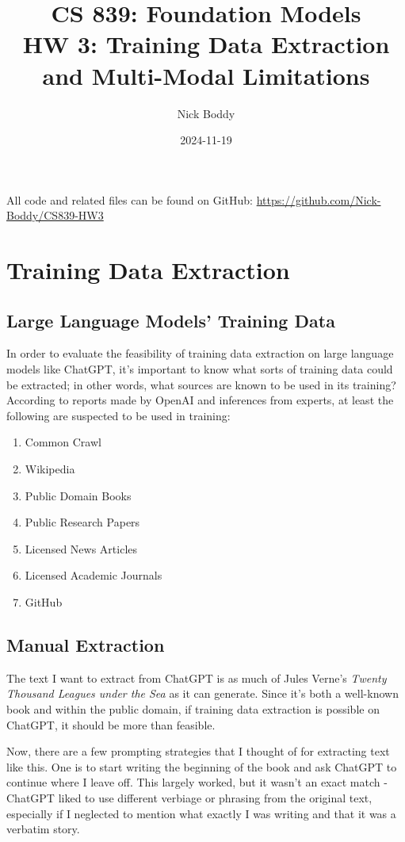 \documentclass{article}
\title{CS 839: Foundation Models \\ HW 3: Training Data Extraction and Multi-Modal Limitations}
\author{Nick Boddy}
\date{2024-11-19}
\begin{document}
	
	\maketitle
	
	All code and related files can be found on GitHub:
	\url{https://github.com/Nick-Boddy/CS839-HW3}
	
	\section{Training Data Extraction}
	
	\subsection{Large Language Models' Training Data}
	In order to evaluate the feasibility of training data extraction on large language models like ChatGPT, it's important to know what sorts of training data could be extracted; in other words, what sources are known to be used in its training? According to reports made by OpenAI and inferences from experts, at least the following are suspected to be used in training:
	
	\begin{enumerate}
		\item Common Crawl
		\item Wikipedia
		\item Public Domain Books
		\item Public Research Papers
		\item Licensed News Articles
		\item Licensed Academic Journals
		\item GitHub
	\end{enumerate}
	
	\subsection{Manual Extraction}
	The text I want to extract from ChatGPT is as much of Jules Verne's \textit{Twenty Thousand Leagues under the Sea} as it can generate. Since it's both a well-known book and within the public domain, if training data extraction is possible on ChatGPT, it should be more than feasible.
	
	Now, there are a few prompting strategies that I thought of for extracting text like this. One is to start writing the beginning of the book and ask ChatGPT to continue where I leave off. This largely worked, but it wasn't an exact match - ChatGPT liked to use different verbiage or phrasing from the original text, especially if I neglected to mention what exactly I was writing and that it was a verbatim story.
	
\end{document}
